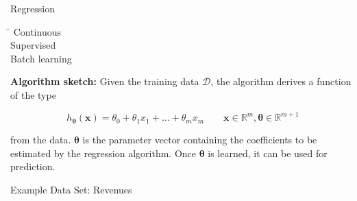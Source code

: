 \begin{frame}{Regression}{}
	\vspace*{-6mm}
	\begin{tabbing}
		\hspace*{7cm}\= \kill
				\> Continuous 		\\[1mm]
		 	\> Supervised 		\\[1mm]
					\> Batch learning	\\[1mm]
	\end{tabbing}
	
	\vspace*{-7mm}
	\footnotesize
	\begin{boxBlueNoFrame}
		\textbf{Algorithm sketch:} Given the training data $\mathcal{D}$, the algorithm derives
		a function of the type
	
		\vspace*{-6mm}
		\begin{equation}
			h_{\bm{\theta}}(\bm{x}) = \theta_0 + \theta_1 x_1 + \dots + \theta_{m} x_{m}
				\qquad \bm{x} \in \mathbb{R}^{m}, \bm{\theta} \in \mathbb{R}^{m+1}
		\end{equation}

		from the data. $\bm{\theta}$ is the parameter vector containing the coefficients to be estimated by the regression
 		algorithm. Once $\bm{\theta}$ is learned, it can be used for prediction. 
	\end{boxBlueNoFrame}
\end{frame}


\begin{frame}{Example Data Set: Revenues}{}
\end{frame}



